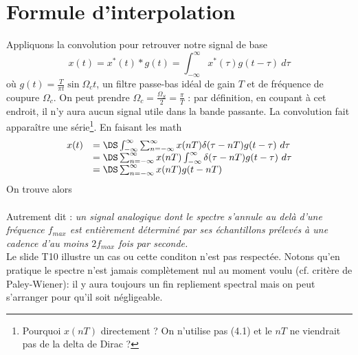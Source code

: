 	\section{Formule d'interpolation}
	Appliquons la convolution  pour retrouver notre signal de base
	\begin{equation}
	x(t) = x^*(t)*g(t) = \int_{-\infty}^\infty x^*(\tau)g(t-\tau)\ d\tau
	\end{equation}
	où $g(t) = \frac{T}{\pi t}\sin\Omega_ct$, un filtre passe-bas idéal de gain $T$ et de fréquence 
	de coupure $\Omega_c$. On peut prendre $\Omega_c = \frac{\Omega_S}{2}=\frac{\pi}{T}$ : par définition, 
	en coupant à cet endroit, il n'y aura aucun signal utile dans la bande passante. La convolution 
	fait apparaître une série\footnote{Pourquoi $x(nT)$ directement ? On n'utilise pas (4.1) et le $nT$ 
	ne viendrait pas de la delta de Dirac ?}. En faisant les math
	\begin{equation}
	\begin{array}{ll}
	x(t) &= \DS \int_{-\infty}^\infty\sum_{n=-\infty}^\infty x(nT)\delta(\tau-nT)g(t-\tau)\ d\tau\\
	&= \DS \sum_{n=-\infty}^\infty x(nT)\int_{-\infty}^\infty \delta(\tau-nT)g(t-\tau)\ d\tau\\
	&=\DS \sum_{n=-\infty}^\infty x(nT)g(t-nT)
	\end{array}
	\end{equation}
	On trouve alors \\
	
	\ \\
	 
	Autrement dit : \textit{un signal analogique dont le spectre s'annule au delà d'une fréquence 
	$f_{max}$ est entièrement déterminé par ses échantillons prélevés à une cadence d'au moins 
	$2f_{max}$ fois par seconde.}\ \\
	
	Le slide T10 illustre un cas ou cette conditon n'est pas respectée.  Notons qu'en pratique le 
	spectre n'est jamais complètement nul au moment voulu (cf. critère de Paley-Wiener): il y aura 
	toujours un fin repliement 	spectral mais on peut s'arranger pour qu'il soit négligeable.
	
